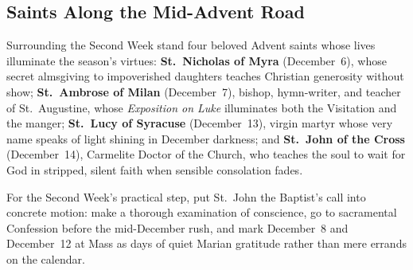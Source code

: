 \subsection{Saints Along the Mid-Advent Road}

Surrounding the Second Week stand four beloved Advent saints whose lives illuminate the season's virtues: \textbf{St.~Nicholas of Myra} (December~6), whose secret almsgiving to impoverished daughters teaches Christian generosity without show; \textbf{St.~Ambrose of Milan} (December~7), bishop, hymn-writer, and teacher of St.~Augustine, whose \textit{Exposition on Luke} illuminates both the Visitation and the manger; \textbf{St.~Lucy of Syracuse} (December~13), virgin martyr whose very name speaks of light shining in December darkness; and \textbf{St.~John of the Cross} (December~14), Carmelite Doctor of the Church, who teaches the soul to wait for God in stripped, silent faith when sensible consolation fades.

For the Second Week's practical step, put St.~John the Baptist's call into concrete motion: make a thorough examination of conscience, go to sacramental Confession before the mid-December rush, and mark December~8 and December~12 at Mass as days of quiet Marian gratitude rather than mere errands on the calendar.
